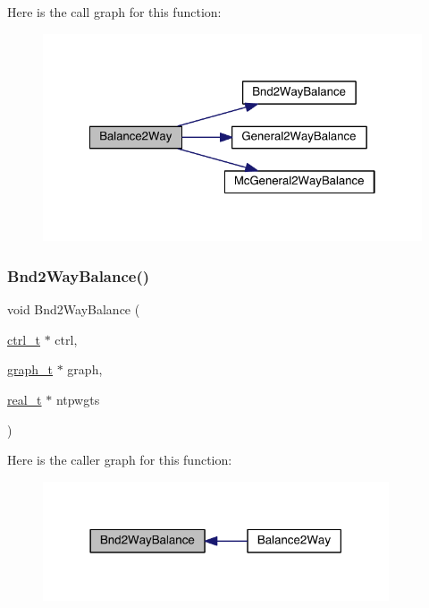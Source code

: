 Here is the call graph for this function\+:\nopagebreak
\begin{figure}[H]
\begin{center}
\leavevmode
\includegraphics[width=322pt]{a00173_a11bd5be7764194a2bb8d6cfe580a30b8_cgraph}
\end{center}
\end{figure}
\mbox{\label{a00173_ab06911b71a6e285ceb52bb80b6592e79}} 
\subsubsection{\texorpdfstring{Bnd2\+Way\+Balance()}{Bnd2WayBalance()}}
{\footnotesize\ttfamily void Bnd2\+Way\+Balance (\begin{DoxyParamCaption}\item[{\hyperlink{a00742}{ctrl\+\_\+t} $\ast$}]{ctrl,  }\item[{\hyperlink{a00734}{graph\+\_\+t} $\ast$}]{graph,  }\item[{\hyperlink{a00876_a1924a4f6907cc3833213aba1f07fcbe9}{real\+\_\+t} $\ast$}]{ntpwgts }\end{DoxyParamCaption})}

Here is the caller graph for this function\+:\nopagebreak
\begin{figure}[H]
\begin{center}
\leavevmode
\includegraphics[width=290pt]{a00173_ab06911b71a6e285ceb52bb80b6592e79_icgraph}
\end{center}
\end{figure}
\mbox{\label{a00173_a726f3ab2e1dbf55fcf3c6a31037542f5}} 
